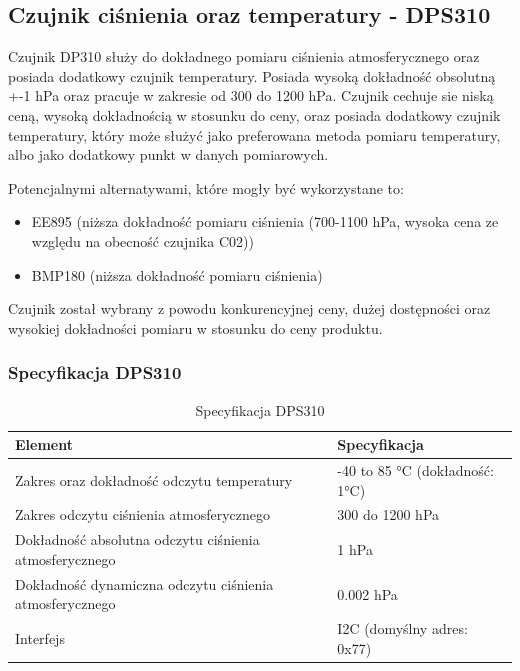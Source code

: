 \documentclass[12pt,a4paper]{article}
\begin{document}
\subsection{Czujnik ciśnienia oraz temperatury - DPS310}

Czujnik DP310 służy do dokładnego pomiaru ciśnienia atmosferycznego oraz posiada dodatkowy czujnik temperatury. Posiada wysoką dokładność obsolutną +-1 hPa oraz 
pracuje w zakresie od 300 do 1200 hPa. Czujnik cechuje sie niską ceną, wysoką dokładnością w stosunku do ceny, oraz posiada dodatkowy czujnik temperatury, który może 
służyć jako preferowana metoda pomiaru temperatury, albo jako dodatkowy punkt w danych pomiarowych.

Potencjalnymi alternatywami, które mogły być wykorzystane to:
\begin{itemize}
    \item EE895 (niższa dokładność pomiaru ciśnienia (700-1100 hPa, wysoka cena ze względu na obecność czujnika C02))
    \item BMP180 (niższa dokładność pomiaru ciśnienia)
\end{itemize}

Czujnik został wybrany z powodu konkurencyjnej ceny, dużej dostępności oraz wysokiej dokładności pomiaru w stosunku do ceny produktu.

\subsubsection{Specyfikacja DPS310}

\begin{table}[H]
    \centering
    \begin{tabular}{|l|l|}
        \hline
        Element & Specyfikacja \\
        \hline
        Zakres oraz dokładność odczytu temperatury & -40 to 85 °C (dokładność: 1°C) \\
        \hline
        Zakres odczytu ciśnienia atmosferycznego & 300 do 1200 hPa \\
        \hline
        Dokładność absolutna odczytu ciśnienia atmosferycznego & 1 hPa \\
        \hline
        Dokładność dynamiczna odczytu ciśnienia atmosferycznego & 0.002 hPa \\
        \hline
        Interfejs & I2C (domyślny adres: 0x77) \\
        \hline
    \end{tabular}
    \caption{Specyfikacja DPS310}
    \label{dps310-spec}
\end{table}
\end{document}
